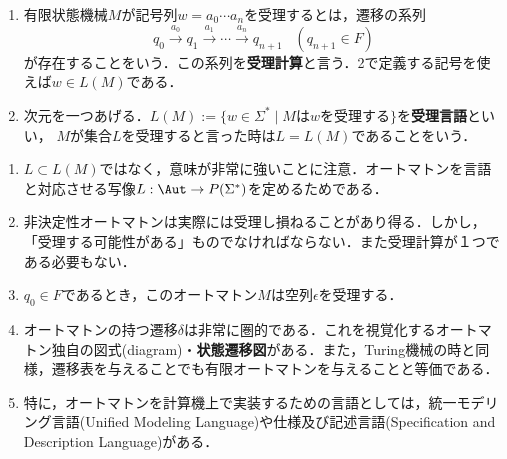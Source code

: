 \begin{definition}\mbox{}
    \begin{enumerate}
        \item 有限状態機械$M$が記号列$w=a_0\cdots a_n$を受理するとは，遷移の系列
        \[ q_0\xrightarrow{a_0}q_1\xrightarrow{a_1}\cdots\xrightarrow{a_n}q_{n+1}\;\;\;(q_{n+1}\in F) \]
        が存在することをいう．この系列を\textbf{受理計算}と言う．2で定義する記号を使えば$w\in L(M)$である．
        \item 次元を一つあげる．$L(M):=\{w\in\Sigma^*\mid Mはwを受理する\}$を\textbf{受理言語}といい，
        $M$が集合$L$を受理すると言った時は$L=L(M)$であることをいう．
    \end{enumerate}
\end{definition}

\begin{remark}\mbox{}
    \begin{enumerate}
        \item $L\subset L(M)$ではなく，意味が非常に強いことに注意．オートマトンを言語と対応させる写像$L:\Aut\to P(\Sigma^*)$を定めるためである．
        \item 非決定性オートマトンは実際には受理し損ねることがあり得る．しかし，「受理する可能性がある」ものでなければならない．また受理計算が１つである必要もない．
        \item $q_0\in F$であるとき，このオートマトン$M$は空列$\epsilon$を受理する．
        \item オートマトンの持つ遷移$\delta$は非常に圏的である．これを視覚化するオートマトン独自の図式(diagram)・\textbf{状態遷移図}がある．また，Turing機械の時と同様，遷移表を与えることでも有限オートマトンを与えることと等価である．
        \item 特に，オートマトンを計算機上で実装するための言語としては，統一モデリング言語(Unified Modeling Language)や仕様及び記述言語(Specification and Description Language)がある．
    \end{enumerate}
\end{remark}

